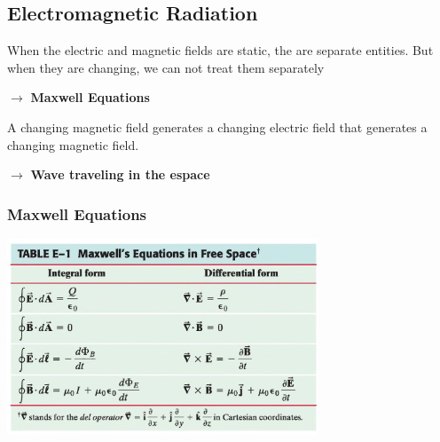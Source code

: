 \documentclass[]{beamer}
\begin{document}
\subsection{Electromagnetic Radiation}

\begin{frame}

When the electric and magnetic fields are static, the are separate entities. But when they are changing,  we can not treat them separately 

\pause
\vspace{3mm}

$\rightarrow$ \textbf{Maxwell Equations}

\pause
\vspace{3mm}

A changing magnetic field generates a changing electric field that generates a changing magnetic field.

\pause
\vspace{3mm}

$\rightarrow$ \textbf{Wave traveling in the espace}

  \end{frame}



\begin{frame}
\frametitle{Maxwell Equations}


  \begin{center}
  \includegraphics[height=2.3in]{images5/Maxwell_EQ.jpg}
\end{center}



  \end{frame}



\end{document}
